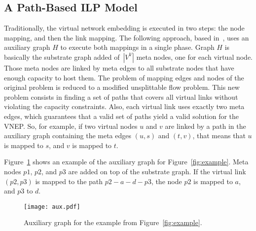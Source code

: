 \documentclass[12pt]{article}
\begin{document}
\subsection{A Path-Based ILP Model}
Traditionally, the virtual network embedding is executed in two steps: the node mapping, and then the link mapping. 
The following approach, based in~\cite{Chowdhury:2012}, uses an auxiliary graph $H$ to execute both mappings in a single phase. 
Graph $H$ is basically the substrate graph added of~$|V^{V}|$ meta nodes, one for each virtual node. 
Those meta nodes are linked by meta edges to all substrate nodes that have enough capacity to host them. 
The problem of mapping edges and nodes of the original problem is reduced to a modified unsplittable flow problem. 
This new problem consists in finding a set of paths that covers all virtual links without violating the capacity constraints. 
Also, each virtual link uses exactly two meta edges, which guarantees that a valid set of paths yield a valid solution for the VNEP.
So, for example, if two virtual nodes $u$ and $v$ are linked by a path in the auxiliary graph containing the meta edges $(u,s)$ and $(t,v)$, that means that $u$ is mapped to $s$, and $v$ is mapped to $t$.

Figure~\ref{fig:aux} shows an example of the auxiliary graph for Figure~\ref{fig:example}.
Meta nodes $p1$, $p2$, and $p3$ are added on top of the substrate graph. If the virtual link $(p2, p3)$ is mapped to the path $p2-a-d-p3$, the node $p2$ is mapped to $a$, and $p3$ to $d$.

\begin{figure}[h!]
  \centering
  \texttt{[image: aux.pdf]}
  \caption{Auxiliary graph for the example from Figure~\ref{fig:example}.\label{fig:aux}}
\end{figure}
\end{document}
